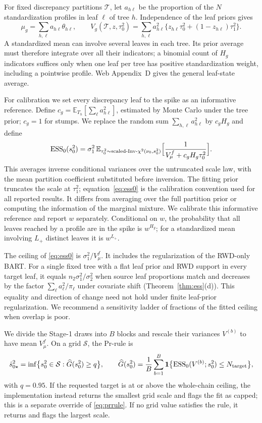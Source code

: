 \documentclass[11pt]{article}
\newcommand{\E}{\mathbb{E}}
\theoremstyle{definition}
\theoremstyle{plain}
\begin{document}
For fixed discrepancy partitions $\mathcal T$, let $a_{h\ell}$ be the proportion of the $N$ standardization profiles in leaf $\ell$ of tree $h$. Independence of the leaf priors gives
\[
\mu_g=\sum_{h,\ell}a_{h\ell}\theta_{h\ell},\qquad
V_g(\mathcal T,z,\tau_0^2)=\sum_{h,\ell}a_{h\ell}^2
 \{z_{h\ell}\tau_0^2+(1-z_{h\ell})\tau_1^2\}.
\]
A standardized mean can involve several leaves in each tree. Its prior average must therefore integrate over all their indicators; a binomial count of $H_g$ indicators suffices only when one leaf per tree has positive standardization weight, including a pointwise profile. Web Appendix~D gives the general leaf-state average.

For calibration we set every discrepancy leaf to the spike as an informative reference. Define $c_g=\E_{T_h}[\sum_\ell a_{h\ell}^2]$, estimated by Monte Carlo under the tree prior; $c_g=1$ for stumps. We replace the random sum $\sum_{h,\ell}a_{h\ell}^2$ by $c_gH_g$ and define
\begin{equation}
\mathrm{ESS}_0(s_0^2)=\sigma_1^2\,\E_{\tau_0^2\sim\text{scaled-Inv-}\chi^2(\nu_0,s_0^2)}\Bigl[\frac{1}{V_\mu^f+c_gH_g\tau_0^2}\Bigr].
\label{eq:ess0}
\end{equation}
This averages inverse conditional variances over the untruncated scale law, with the mean partition coefficient substituted before inversion. The fitting prior truncates the scale at $\tau_1^2$; equation~\eqref{eq:ess0} is the calibration convention used for all reported results. It differs from averaging over the full partition prior or computing the information of the marginal mixture. We calibrate this informative reference and report $w$ separately. Conditional on $w$, the probability that all leaves reached by a profile are in the spike is $w^{H_g}$; for a standardized mean involving $L_+$ distinct leaves it is $w^{L_+}$.

The ceiling of \eqref{eq:ess0} is $\sigma_1^2/V_\mu^f$. It includes the regularization of the RWD-only BART. For a single fixed tree with a flat leaf prior and RWD support in every target leaf, it equals $n_2\sigma_1^2/\sigma_2^2$ when source leaf proportions match and decreases by the factor $\sum_\ell a_\ell^2/\pi_\ell$ under covariate shift (Theorem~\ref{thm:ess}(d)). This equality and direction of change need not hold under finite leaf-prior regularization. We recommend a sensitivity ladder of fractions of the fitted ceiling when overlap is poor.

We divide the Stage-1 draws into $B$ blocks and rescale their variances $V^{(b)}$ to have mean $V_\mu^f$. On a grid $\mathcal S$, the Pr-rule is
\begin{equation}
\hat s^2_{0\star}=\inf\bigl\{s_0^2\in\mathcal S:\widehat G(s_0^2)\ge q\bigr\},\qquad
\widehat G(s_0^2)=\frac{1}B\sum_{b=1}^B\mathbf 1\bigl\{\mathrm{ESS}_0(V^{(b)};s_0^2)\le N_{\rm target}\bigr\},
\label{eq:prrule}
\end{equation}
with $q=0.95$. If the requested target is at or above the whole-chain ceiling, the implementation instead returns the smallest grid scale and flags the fit as capped; this is a separate override of \eqref{eq:prrule}. If no grid value satisfies the rule, it returns and flags the largest scale.
\end{document}
